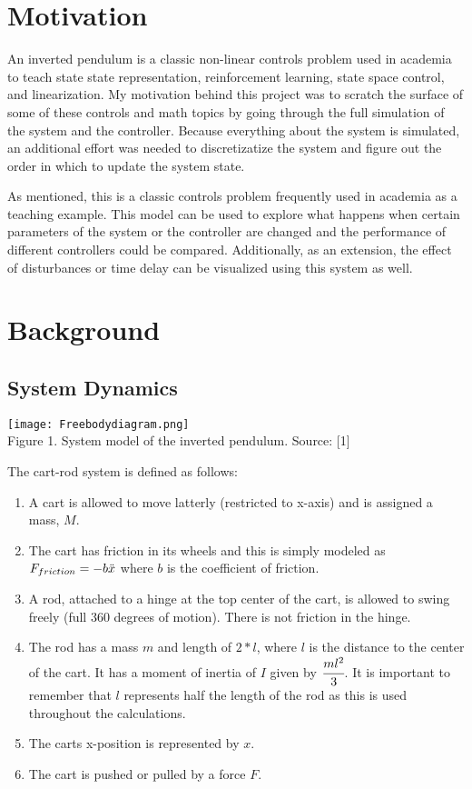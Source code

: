 \documentclass{article}
\begin{document}
\section{Motivation}

An inverted pendulum is a classic non-linear controls problem used in academia to teach state state representation, reinforcement learning, state space control, and linearization. My motivation behind this project was to scratch the surface of some of these controls and math topics by going through the full simulation of the system and the controller. Because everything about the system is simulated, an additional effort was needed to discretizatize the system and figure out the order in which to update the system state.

As mentioned, this is a classic controls problem frequently used in academia as a teaching example. This model can be used to explore what happens when certain parameters of the system or the controller are changed and the performance of different controllers could be compared. Additionally, as an extension, the effect of disturbances or time delay can be visualized using this system as well. 

\section{Background}
\subsection{System Dynamics}

\begin{center}
    \texttt{[image: Freebodydiagram.png]} \\
    Figure 1. System model of the inverted pendulum. Source: [1]
\end{center}
\vspace{3 mm}

\noindent The cart-rod system is defined as follows:
\begin{enumerate}
    \item A cart is allowed to move latterly (restricted to x-axis) and is assigned a mass, $M$.
    \item The cart has friction in its wheels and this is simply modeled as $F_{friction} = -b\Ddot{x}$ where $b$ is the coefficient of friction.
    \item A rod, attached to a hinge at the top center of the cart, is allowed to swing freely (full 360 degrees of motion). There is not friction in the hinge.
    \item The rod has a mass $m$ and length of $2*l$, where $l$ is the distance to the center of the cart. It has a moment of inertia of $I$ given by $\cfrac{ml^2}{3}$. It is important to remember that $l$ represents half the length of the rod as this is used throughout the calculations.
    \item The carts x-position is represented by $x$. 
    \item The cart is pushed or pulled by a force $F$. 
\end{enumerate}
\end{document}
